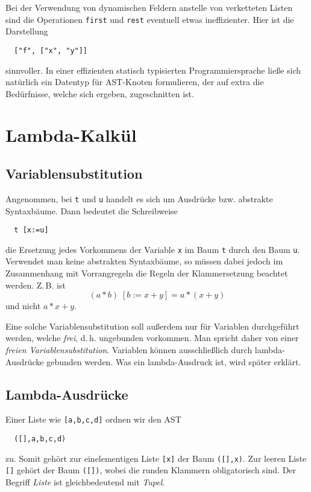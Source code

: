 \documentclass[a4paper,11pt,fleqn,twocolumn,twoside]{article}
\numberwithin{equation}{section}
\begin{document}
Bei der Verwendung von dynamischen Feldern anstelle von verketteten
Listen sind die Operationen \texttt{first} und \texttt{rest} eventuell
etwas ineffizienter. Hier ist die Darstellung
\begin{verbatim}
  ["f", ["x", "y"]]
\end{verbatim}
sinnvoller. In einer effizienten statisch typisierten
Programmiersprache ließe sich natürlich ein Datentyp für AST-Knoten
formulieren, der auf extra die Bedürfnisse, welche sich ergeben,
zugeschnitten ist.

\section{Lambda-Kalkül}
\subsection{Variablensubstitution}
Angenommen, bei \texttt{t} und \texttt{u} handelt es sich um Ausdrücke
bzw. abstrakte Syntaxbäume. Dann bedeutet die Schreibweise
\begin{verbatim}
  t [x:=u]
\end{verbatim}
die Ersetzung jedes Vorkommens der Variable \texttt{x} im Baum
\texttt{t} durch den Baum \texttt{u}. Verwendet man keine abstrakten
Syntaxbäume, so müssen dabei jedoch im Zusammenhang mit Vorrangregeln
die Regeln der Klammersetzung beachtet werden. Z.\,B. ist
\begin{equation}
  (a*b)\;[b:=x+y] = a*(x+y)
\end{equation}
und nicht $a*x+y$.

Eine solche Variablensubstitution soll außerdem nur für
Variablen durchgeführt werden, welche \emph{frei}, d.\,h. ungebunden
vorkommen. Man spricht daher von einer
\emph{freien Variablensubstitution}. Variablen können ausschließlich
durch lambda-Ausdrücke gebunden werden. Was ein lambda-Ausdruck ist,
wird später erklärt.

\subsection{Lambda-Ausdrücke}
Einer Liste wie \verb|[a,b,c,d]| ordnen wir den AST
\begin{verbatim}
  ([],a,b,c,d)
\end{verbatim}
zu. Somit gehört zur einelementigen Liste \verb|[x]| der Baum
\verb|([],x)|. Zur leeren Liste \verb|[]| gehört der Baum \verb|([])|,
wobei die runden Klammern obligatorisch sind.
Der Begriff \emph{Liste} ist gleichbedeutend mit \emph{Tupel}.
\end{document}
